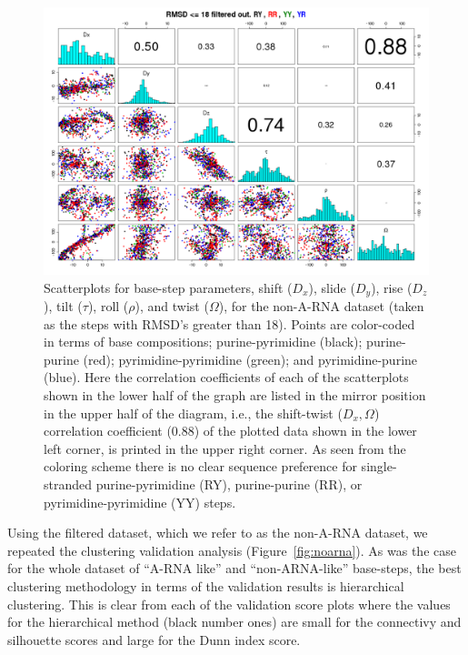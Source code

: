 \begin{figure}
\centering
\includegraphics[angle=90, scale=0.48]{Chapter2/noarna_step.png}
\caption{Scatterplots for base-step parameters, shift ($D_{x}$), slide
  ($D_{y}$), rise  ($D_{z}$), tilt ($\tau$), roll  ($\rho$), and twist
  ($\Omega$),  for the  non-A-RNA  dataset (taken  as  the steps  with
  RMSD's greater  than 18).  Points  are color-coded in terms  of base
  compositions;   purine-pyrimidine   (black);  purine-purine   (red);
  pyrimidine-pyrimidine  (green); and  pyrimidine-purine  (blue). Here
  the correlation  coefficients of each  of the scatterplots  shown in
  the lower half of the graph are listed in the mirror position in the
  upper half  of the diagram, i.e., the  shift-twist ($D_{x}, \Omega$)
  correlation  coefficient (0.88)  of the  plotted data  shown  in the
  lower left  corner, is printed in  the upper right  corner.  As seen
  from the coloring  scheme there is no clear  sequence preference for
  single-stranded  purine-pyrimidine   (RY),  purine-purine  (RR),  or
  pyrimidine-pyrimidine (YY) steps.}
\label{fig:pairsnoarna}
\end{figure}

Using  the  filtered dataset,  which  we  refer  to as  the  non-A-RNA
dataset,    we   repeated    the   clustering    validation   analysis
(Figure~\ref{fig:noarna}).  As  was the case for the  whole dataset of
``A-RNA like''  and ``non-ARNA-like'' base-steps,  the best clustering
methodology  in  terms  of  the  validation  results  is  hierarchical
clustering.  This is  clear from  each of  the validation  score plots
where the values  for the hierarchical method (black  number ones) are
small for the connectivy and  silhouette scores and large for the Dunn
index score.

